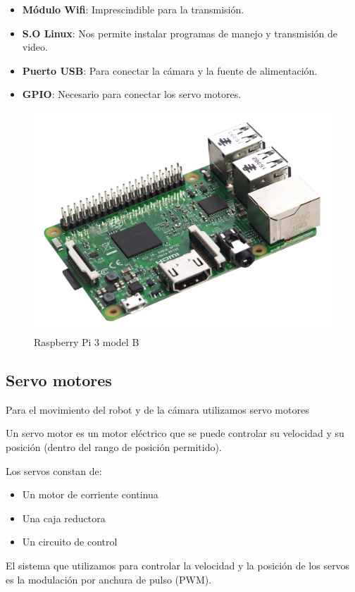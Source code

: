 \documentclass[twoside, 11pt]{epstfg}
\begin{document}
\begin{itemize}
	\item \textbf{Módulo Wifi}: Imprescindible para la transmisión.
	\item \textbf{S.O Linux}: Nos permite instalar programas de manejo y transmisión de video.
	\item \textbf{Puerto USB}: Para conectar la cámara y la fuente de alimentación.
	\item \textbf{GPIO}: Necesario para conectar los servo motores.
\end{itemize}


\begin{figure}[H]
	\centerline{
		\mbox{\includegraphics[width=.80\textwidth]{images/raspi3.jpg}}
	}
	\caption{Raspberry Pi 3 model B}
	
\end{figure}

\subsection{Servo motores}
Para el movimiento del robot y de la cámara utilizamos servo motores


Un servo motor es un motor eléctrico que se puede controlar su velocidad y su posición (dentro del rango de posición permitido).

Los servos constan de:
\begin{itemize}
	\item Un motor de corriente continua
	\item Una caja reductora
	\item Un circuito de control
\end{itemize}

El sistema que utilizamos para controlar la velocidad y la posición de los servos es la modulación por anchura de pulso (PWM).
\end{document}
